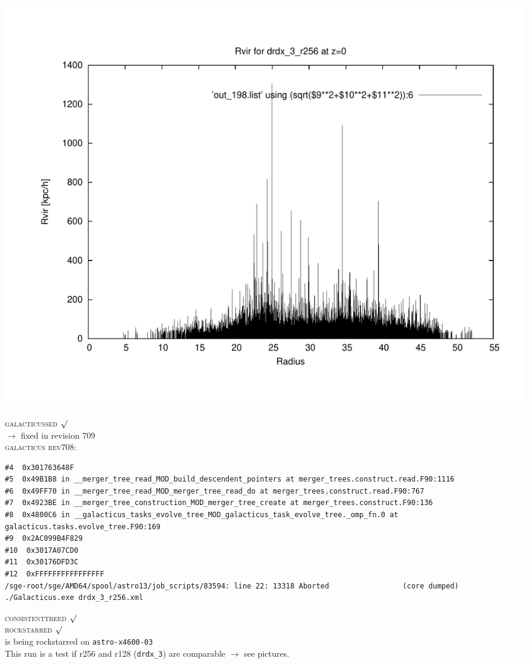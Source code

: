 \includegraphics[scale=0.3]{drdx_3_r256/plot_rvir_z0.pdf}

\textsc{galacticussed} $\surd$ \\
$\rightarrow$ fixed in revision 709 \\

\textsc{galacticus rev708:} \\
\begin{verbatim}
#4  0x301763648F
#5  0x49B1B8 in __merger_tree_read_MOD_build_descendent_pointers at merger_trees.construct.read.F90:1116
#6  0x49FF70 in __merger_tree_read_MOD_merger_tree_read_do at merger_trees.construct.read.F90:767
#7  0x4923BE in __merger_tree_construction_MOD_merger_tree_create at merger_trees.construct.F90:136
#8  0x4800C6 in __galacticus_tasks_evolve_tree_MOD_galacticus_task_evolve_tree._omp_fn.0 at galacticus.tasks.evolve_tree.F90:169
#9  0x2AC099B4F829
#10  0x3017A07CD0
#11  0x30176DFD3C
#12  0xFFFFFFFFFFFFFFFF
/sge-root/sge/AMD64/spool/astro13/job_scripts/83594: line 22: 13318 Aborted                 (core dumped) ./Galacticus.exe drdx_3_r256.xml
\end{verbatim}
\textsc{consistenttreed} $\surd$ \\
\textsc{rockstarred} $\surd$ \\
is being rockstarred on \texttt{astro-x4600-03} \\
This run is a test if r256 and r128 (\texttt{drdx\_3}) 
are comparable $\rightarrow$ see pictures. \\
	
% 
%
%
%
%
%
%
%


